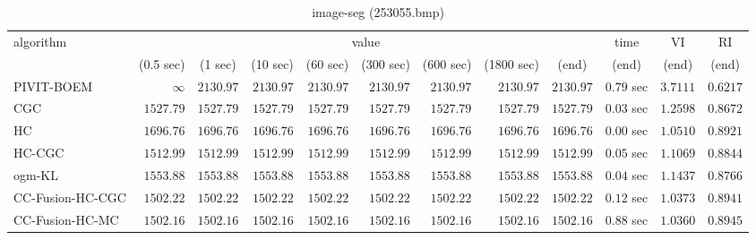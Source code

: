 \begin{table}[H]
\scriptsize
\centering
\caption{image-seg (253055.bmp)}
\label{tab:anytimetable-image-seg-253055.bmp}
\begin{tabular}{lrrrrrrrrrrr}
\toprule
           algorithm &                                   \multicolumn{8}{c}{value} & \multicolumn{1}{c}{time}    & \multicolumn{1}{c}{VI}  & \multicolumn{1}{c}{RI} \\  
\cmidrule(lr){2-9}\cmidrule(lr){10-10} \cmidrule(lr){11-11} \cmidrule(lr){12-12}   
                     & \multicolumn{1}{c}{(0.5 sec)} & \multicolumn{1}{c}{(1 sec)} & \multicolumn{1}{c}{(10 sec)} & \multicolumn{1}{c}{(60 sec)} & \multicolumn{1}{c}{(300 sec)} & \multicolumn{1}{c}{(600 sec)} & \multicolumn{1}{c}{(1800 sec)} & \multicolumn{1}{c}{(end)} & \multicolumn{1}{c}{(end)}    & \multicolumn{1}{c}{(end)}   & \multicolumn{1}{c}{(end)}  \\ \midrule 
          PIVIT-BOEM & $\infty$ & $      2130.97$ & $      2130.97$ & $      2130.97$ & $      2130.97$ & $      2130.97$ & $      2130.97$ & $      2130.97$ & $         0.79$ sec    & $       3.7111$  & $       0.6217$ \\ 
                 CGC & $      1527.79$ & $      1527.79$ & $      1527.79$ & $      1527.79$ & $      1527.79$ & $      1527.79$ & $      1527.79$ & $      1527.79$ & $         0.03$ sec    & $       1.2598$  & $       0.8672$ \\ 
                  HC & $      1696.76$ & $      1696.76$ & $      1696.76$ & $      1696.76$ & $      1696.76$ & $      1696.76$ & $      1696.76$ & $      1696.76$ & $         0.00$ sec    & $       1.0510$  & $       0.8921$ \\ 
              HC-CGC & $      1512.99$ & $      1512.99$ & $      1512.99$ & $      1512.99$ & $      1512.99$ & $      1512.99$ & $      1512.99$ & $      1512.99$ & $         0.05$ sec    & $       1.1069$  & $       0.8844$ \\ 
              ogm-KL & $      1553.88$ & $      1553.88$ & $      1553.88$ & $      1553.88$ & $      1553.88$ & $      1553.88$ & $      1553.88$ & $      1553.88$ & $         0.04$ sec    & $       1.1437$  & $       0.8766$ \\ 
    CC-Fusion-HC-CGC & $      1502.22$ & $      1502.22$ & $      1502.22$ & $      1502.22$ & $      1502.22$ & $      1502.22$ & $      1502.22$ & $      1502.22$ & $         0.12$ sec    & $       1.0373$  & $       0.8941$ \\ 
     CC-Fusion-HC-MC & $      1502.16$ & $      1502.16$ & $      1502.16$ & $      1502.16$ & $      1502.16$ & $      1502.16$ & $      1502.16$ & $      1502.16$ & $         0.88$ sec    & $       1.0360$  & $       0.8945$ \\ 

\end{tabular}
\end{table}
